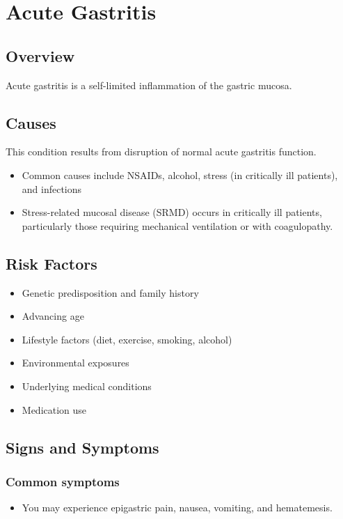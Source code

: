 \chapter{Acute Gastritis}
\label{sec:Acute Gastritis}

\section{Overview}
Acute gastritis is a self-limited inflammation of the gastric mucosa.
\section{Causes}
This condition results from disruption of normal acute gastritis function.

\begin{itemize}[noitemsep]
  \item Common causes include NSAIDs, alcohol, stress (in critically ill patients), and infections
  \item Stress-related mucosal disease (SRMD) occurs in critically ill patients, particularly those requiring mechanical ventilation or with coagulopathy.
\end{itemize}
\section{Risk Factors}


\begin{itemize}[noitemsep]
  \item Genetic predisposition and family history
  \item Advancing age
  \item Lifestyle factors (diet, exercise, smoking, alcohol)
  \item Environmental exposures
  \item Underlying medical conditions
  \item Medication use
\end{itemize}
\section{Signs and Symptoms}

\subsection{Common symptoms}
\begin{itemize}[noitemsep]
  \item You may experience epigastric pain, nausea, vomiting, and hematemesis. 
  \end{itemize}

